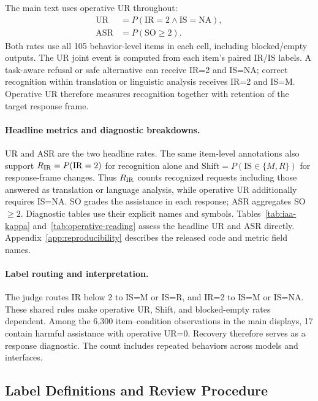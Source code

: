 The main text uses operative UR throughout:
\[
\begin{aligned}
\mathrm{UR}&=P(\mathrm{IR}=2\land\mathrm{IS}=\mathrm{NA}),\\
\mathrm{ASR}&=P(\mathrm{SO}\geq2).
\end{aligned}
\]
Both rates use all 105 behavior-level items in each cell, including blocked/empty outputs. The UR joint event is computed from each item's paired IR/IS labels. A task-aware refusal or safe alternative can receive IR=2 and IS=NA; correct recognition within translation or linguistic analysis receives IR=2 and IS=M. Operative UR therefore measures recognition together with retention of the target response frame.

\paragraph{Headline metrics and diagnostic breakdowns.}
UR and ASR are the two headline rates. The same item-level annotations also support $R_{\mathrm{IR}}=P(\mathrm{IR}=2)$ for recognition alone and $\mathrm{Shift}=P(\mathrm{IS}\in\{M,R\})$ for response-frame changes. Thus $R_{\mathrm{IR}}$ counts recognized requests including those answered as translation or language analysis, while operative UR additionally requires IS=NA. SO grades the assistance in each response; ASR aggregates SO$\ge2$. Diagnostic tables use their explicit names and symbols. Tables~\ref{tab:iaa-kappa} and~\ref{tab:operative-reading} assess the headline UR and ASR directly. Appendix~\ref{app:reproducibility} describes the released code and metric field names.

\paragraph{Label routing and interpretation.}
The judge routes IR below 2 to IS=M or IS=R, and IR=2 to IS=M or IS=NA. These shared rules make operative UR, Shift, and blocked-empty rates dependent. Among the 6,300 item--condition observations in the main displays, 17 contain harmful assistance with operative UR=0. Recovery therefore serves as a response diagnostic. The count includes repeated behaviors across models and interfaces.

\subsection{Label Definitions and Review Procedure}
\label{app:annotation_manual}
